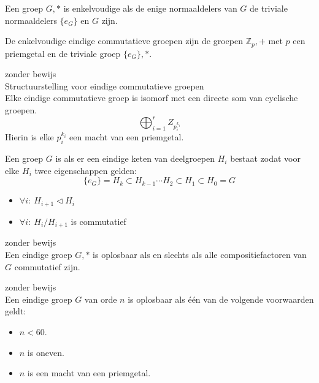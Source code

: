 \documentclass[main.tex]{subfiles}
\begin{document}
\begin{de}
  Een groep $G,*$ is enkelvoudige als de enige normaaldelers van $G$ de triviale normaaldelers $\{e_{G}\}$ en $G$ zijn.
\end{de}


\begin{pr}
  De enkelvoudige eindige commutatieve groepen zijn de groepen $\mathbb{Z}_{p},+$ met $p$ een priemgetal en de triviale groep $\{e_{G}\},*$.
  
\end{pr}

\begin{st}
  zonder bewijs\\
  Structuurstelling voor eindige commutatieve groepen\\
  Elke eindige commutatieve groep is isomorf met een directe som van cyclische groepen.
  \[ \bigoplus_{i=1}^{r} Z_{p_{i}^{k_{i}}} \]
  Hierin is elke $p_{i}^{k_{i}}$ een macht van een priemgetal.
\end{st}

\begin{de}
  Een groep $G$ is  als er een eindige keten van deelgroepen $H_{i}$ bestaat zodat voor elke $H_{i}$ twee eigenschappen gelden:
  \[ \{e_{G}\} = H_{k} \subset H_{k-1} \dotsb H_{2} \subset H_{1} \subset H_{0} = G \]
  \begin{itemize}
  \item $\forall i:\ H_{i+1} \triangleleft H_{i}$
  \item $\forall i:\ H_{i}/H_{i+1}$ is commutatief
  \end{itemize}
\end{de}

\begin{st}
  zonder bewijs\\
  Een eindige groep $G,*$ is oplosbaar als en slechts als alle compositiefactoren van $G$ commutatief zijn.
\end{st}

\begin{st}
  zonder bewijs\\
  Een eindige groep $G$ van orde $n$ is oplosbaar als \'e\'en van de volgende voorwaarden geldt:
  \begin{itemize}
  \item $n < 60$.
  \item $n$ is oneven.
  \item $n$ is een macht van een priemgetal.
  \end{itemize}
\end{st}
\end{document}
